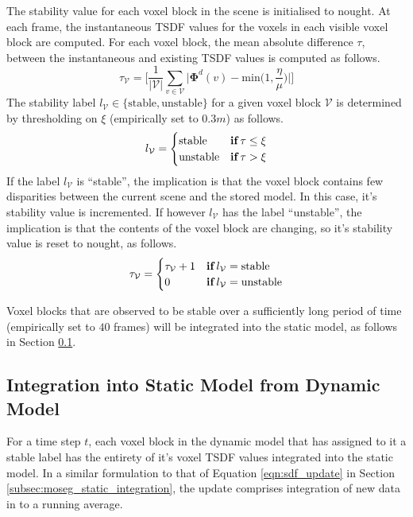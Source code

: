 The stability value for each voxel block in the scene is initialised to nought.
At each frame, the instantaneous TSDF values for the voxels in each visible
voxel block are computed. For each voxel block, the mean absolute difference
$\tau$, between the instantaneous and existing TSDF values is computed as
follows.
\begin{equation}
  \label{eqn:moseg_stability_value}
  \tau_{\mathcal{V}} = \Bigg[ \frac{1}{|\mathcal{V}|} \sum_{v \in \mathcal{V}}
  \bigg|\mathbf{\Phi}^{d}(v) - \text{min}\bigg(1, \frac{\eta}{\mu}\bigg)\bigg| \Bigg]
\end{equation}
The stability label $l_{\mathcal{V}} \in \{\text{stable}, \text{unstable}\}$ for
a given voxel block $\mathcal{V}$ is determined by thresholding on $\xi$ 
(empirically set to $0.3m$) as follows.
\begin{equation}
  \label{eqn:moseg_stability_labelling}
  l_{\mathcal{V}} =
  \begin{cases}
    \text{stable} & \textbf{if} \mkern4mu \tau \leq \xi \\
    \text{unstable} & \textbf{if} \mkern4mu \tau > \xi
  \end{cases}
\end{equation}
If the label $l_{\mathcal{V}}$ is ``stable'', the implication is that the voxel
block contains few disparities between the current scene and the stored model.
In this case, it's stability value is incremented. If however
$l_{\mathcal{V}}$ has the label ``unstable'', the implication is that the
contents of the voxel block are changing, so it's stability value is reset to
nought, as follows.
\begin{equation}
  \label{eqn:moseg_stability_update}
  \tau_{\mathcal{V}} =
  \begin{cases}
    \tau_{\mathcal{V}} + 1 & \textbf{if} \mkern4mu l_{\mathcal{V}} =
    \text{stable}\\
    0 & \textbf{if} \mkern4mu l_{\mathcal{V}} = \text{unstable}
  \end{cases}
\end{equation}

Voxel blocks that are observed to be stable over a sufficiently long period of
time (empirically set to $40$ frames) will be integrated into the static model,
as follows in Section \ref{sub:moseg_static_to_dynamic}.

\subsection{Integration into Static Model from Dynamic Model}
\label{sub:moseg_static_to_dynamic}
For a time step $t$, each voxel block in the dynamic model that has assigned to
it a stable label has the entirety of it's voxel TSDF values integrated into the
static model. In a similar formulation to that of Equation \ref{eqn:sdf_update}
in Section \ref{subsec:moseg_static_integration}, the update comprises 
integration of new data in to a running average.


